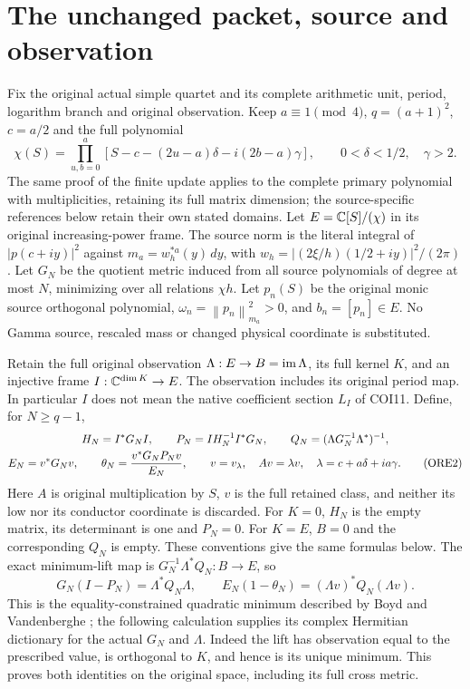 \documentclass[11pt,a4paper]{article}
\providecommand{\norm}[1]{\left\lVert#1\right\rVert}
\begin{document}
\section{The unchanged packet, source and observation}
Fix the original actual simple quartet and its complete arithmetic unit,
period, logarithm branch and original observation. Keep
$a\equiv1\pmod4$, $q=(a+1)^2$, $c=a/2$ and the full polynomial
\[
 \chi(S)=\prod_{u,b=0}^a
 [S-c-(2u-a)\delta-i(2b-a)\gamma],\qquad
 0<\delta<1/2,\quad\gamma>2.                         \tag{ORE1}
\]
The same proof of the finite update applies to the complete primary
polynomial with multiplicities, retaining its full matrix dimension;
the source-specific references below retain their own stated domains.
Let $E=\mathbb C[S]/(\chi)$ in its original increasing-power frame.
The source norm is the literal integral of $|p(c+iy)|^2$ against
$m_a=w_h^{*a}(y)\,dy$, with $w_h=|(2\xi/h)(1/2+iy)|^2/(2\pi)$.
Let $G_N$ be the quotient metric induced from all source polynomials
of degree at most $N$, minimizing over all relations $\chi h$.
Let $p_n(S)$ be the original monic source orthogonal polynomial,
$\omega_n=\norm{p_n}_{m_a}^2>0$, and $b_n=[p_n]\in E$.
No Gamma source, rescaled mass or changed physical coordinate is substituted.

Retain the full original observation $\Lambda:E\to B=\operatorname{im}\Lambda$,
its full kernel $K$, and an injective frame $I:\mathbb C^{\dim K}\to E$.
The observation includes its original period map. In particular $I$
does not mean the native coefficient section $L_I$ of COI11.
Define, for $N\ge q-1$,
\begin{gather}
 H_N=I^*G_NI,\qquad
 P_N=I H_N^{-1}I^*G_N,\qquad
 Q_N=(\Lambda G_N^{-1}\Lambda^*)^{-1},\notag\\
 E_N=v^*G_Nv,\qquad
 \theta_N=\frac{v^*G_NP_Nv}{E_N},\qquad
 v=v_\lambda,\quad Av=\lambda v,\quad
 \lambda=c+a\delta+ia\gamma.                         \tag{ORE2}
\end{gather}
Here $A$ is original multiplication by $S$, $v$ is the full retained
class, and neither its low nor its conductor coordinate is discarded.
For $K=0$, $H_N$ is the empty matrix, its determinant is one and
$P_N=0$. For $K=E$, $B=0$ and the corresponding $Q_N$ is empty.
These conventions give the same formulas below.
The exact minimum-lift map is
$G_N^{-1}\Lambda^*Q_N:B\to E$, so
\[
 G_N(I-P_N)=\Lambda^*Q_N\Lambda,
 \qquad E_N(1-\theta_N)=(\Lambda v)^*Q_N(\Lambda v).    \tag{ORE3}
\]
This is the equality-constrained quadratic minimum described by
Boyd and Vandenberghe \cite[Appendix C.4.1, p.~673]{a04ore:Boyd};
the following calculation supplies its complex Hermitian dictionary
for the actual $G_N$ and $\Lambda$.
Indeed the lift has observation equal to the prescribed value, is
orthogonal to $K$, and hence is its unique minimum. This proves both
identities on the original space, including its full cross metric.
\end{document}
